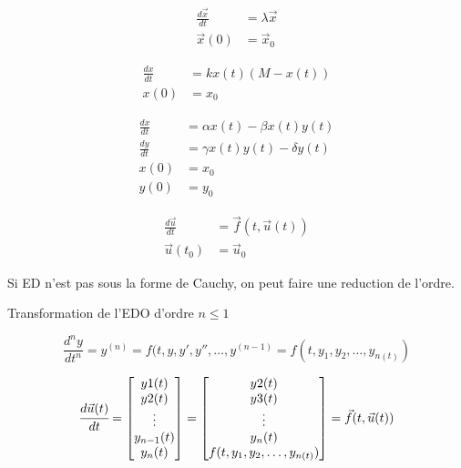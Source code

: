 \hformbar{}



\begin{align*}
    \frac{d\vec{x}}{dt} &= \lambda \vec{x} \\
    \vec{x}(0) &= \vec{x}_0
\end{align*}


\begin{align*}
    \frac{dx}{dt} &= k x(t) (M-x(t)) \\
    x(0) &= x_0
\end{align*}


\begin{align*}
    \frac{dx}{dt} &= \alpha x(t) - \beta x(t)y(t) \\
    \frac{dy}{dt} &= \gamma x(t)y(t) - \delta y(t) \\
    x(0) &= x_0 \\
    y(0) &= y_0
\end{align*}


\begin{align*}
    \frac{d\vec{u}}{dt} &= \vec{f}(t, \vec{u}(t)) \\
    \vec{u}(t_0) &= \vec{u}_0
\end{align*}

Si ED n'est pas sous la forme de Cauchy, on peut faire une reduction de l'ordre.

Transformation de l'EDO d'ordre $n \leq 1$

$$ \frac{d^ny}{dt^n} = y^{(n)} = f(t, y, y', y'', \dots,y^{(n-1)} = f(t, y_1, y_2, \dots,y_{n(t)}) $$

$$\cfrac{d\vec{u}(t)}{dt} = \begin{bmatrix}
    y1(t) \\
    y2(t) \\
    \vdots \\
    y_{n-1}(t) \\
    y_n(t)
\end{bmatrix} = \begin{bmatrix}
    y2(t) \\
    y3(t) \\
    \vdots \\
    y_n(t) \\
    f(t, y_1, y_2, \dots,y_{n(t)})
\end{bmatrix} = \vec{f}(t, \vec{u}(t))$$

